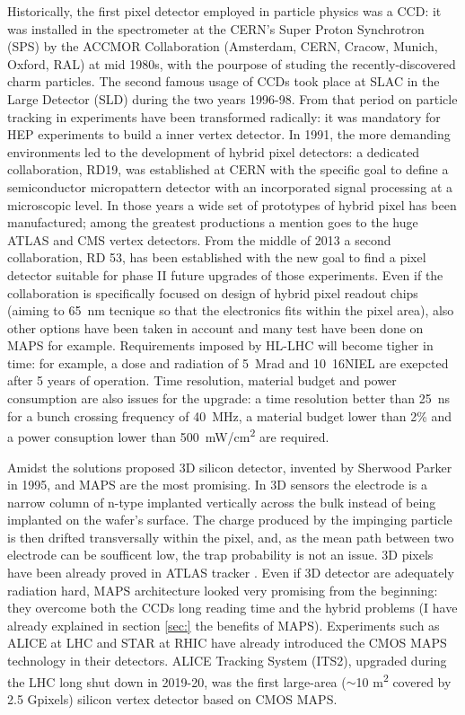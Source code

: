     Historically, the first pixel detector employed in particle physics was a CCD: it was installed in the spectrometer at the CERN’s Super Proton Synchrotron (SPS) by the ACCMOR Collaboration (Amsterdam, CERN, Cracow, Munich, Oxford, RAL) at mid 1980s, with the pourpose of studing the recently-discovered charm particles.
    The second famous usage of CCDs took place at SLAC in the Large Detector (SLD) during the two years 1996-98. 
    From that period on particle tracking in experiments have been transformed radically: it was mandatory for HEP experiments to build a inner vertex detector. 
    In 1991, the more demanding environments led to the development of hybrid pixel detectors: a dedicated collaboration, RD19, was established at CERN with the specific goal to define a semiconductor micropattern detector with an incorporated signal processing at a microscopic level. 
    In those years a wide set of prototypes of hybrid pixel has been manufactured; among the greatest productions a mention goes to the huge ATLAS and CMS vertex detectors. 
    From the middle of 2013 a second collaboration, RD 53, has been established with the new goal to find a pixel detector suitable for phase II future upgrades of those experiments. Even if the collaboration is specifically focused on design of hybrid pixel readout chips (aiming to \SI{65}{nm} tecnique so that the electronics fits within the pixel area), also other options have been taken in account and many test have been done on MAPS for example. Requirements imposed by HL-LHC will become tigher in time: for example, a dose and radiation of \SI{5}{Mrad} and \si{10 {16}}{NIEL} are exepcted after 5 years of operation. Time resolution, material budget and power consumption are also issues for the upgrade: a time resolution better than \SI{25}{ns} for a bunch crossing frequency of \SI{40}{MHz}, a material budget lower than 2\% and a power consuption lower than  \SI{500}{mW/cm\squared} are required. 

    Amidst the solutions proposed 3D silicon detector, invented by Sherwood Parker in 1995, and MAPS are the most promising. In 3D sensors the electrode is a narrow column of n-type implanted vertically across the bulk instead of being implanted on the wafer's surface. 
    The charge produced by the impinging particle is then drifted transversally within the pixel, and, as the mean path between two electrode can be soufficent low, the trap probability is not an issue. 
    3D pixels have been already proved in ATLAS tracker . 
    Even if 3D detector are adequately radiation hard, MAPS architecture looked very promising from the beginning: they overcome both the CCDs long reading time and the hybrid problems (I have already explained in section \ref{sec:} the benefits of MAPS). 
    Experiments such as ALICE at LHC and STAR at RHIC have already introduced the CMOS MAPS technology in their detectors. ALICE Tracking System (ITS2), upgraded during the LHC long shut down in 2019-20, was the first large-area ($\sim$10 \si{m\squared} covered by 2.5 Gpixels) silicon vertex detector based on CMOS MAPS.

